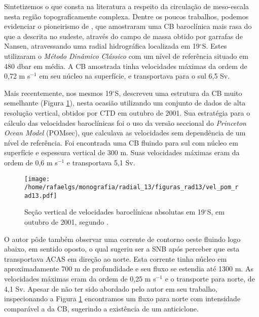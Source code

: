 Sintetizemos o que consta na literatura a respeito da circulação de meso-escala
nesta região topograficamente complexa. Dentre os poucos trabalhos, podemos
evidenciar o pioneirismo de \cite{miranda_castro1981}, que amostraram uma CB baroclínica mais rasa do que a descrita
no sudeste, através do campo de massa obtido por garrafas de Nansen, atravessando uma
radial hidrográfica localizada em 19$^\circ$S. Estes utilizaram o {\it Método Dinâmico Clássico} \citep{sandstrom_helland1903} com um 
nível de referência situado em 480 dbar em média. A CB amostrada tinha velocidades máximas da 
ordem de 0,72 m s$^{-1}$ em seu núcleo na superfície, e transportava para o sul 6,5 Sv.

Mais recentemente, nos mesmos 19$^\circ$S, \cite{soutelino2005} descreveu uma estrutura da CB muito semelhante (Figura \ref{fig:soutelino19}),
nesta ocasião utilizando um conjunto de dados de alta resolução vertical, obtidos por CTD em 
outubro de 2001. Sua estratégia para o cálculo das velocidades baroclínicas foi o uso da versão 
seccional do {\it Princeton Ocean Model} (POMsec), que calculava as velocidades sem dependência de um nível de referência. 
Foi encontrada uma CB fluindo para sul com núcleo em superfície e espessura
vertical de 300 m. Suas  velocidades máximas eram da ordem de 0,6 m s$^{-1}$ e transportava
5,1 Sv. 

\begin{figure}[hb]
 \begin{center}
  \texttt{[image: /home/rafaelgs/monografia/radial\_13/figuras\_rad13/vel\_pom\_rad13.pdf]}
 \end{center}
 \vspace{-.5cm}
 \renewcommand{\baselinestretch}{1}
 \caption{\label{fig:soutelino19} \small Seção vertical de velocidades baroclínicas absolutas em
19$^\circ$S, em outubro de 2001, segundo \cite{soutelino2005}.}
\end{figure}

O autor pôde também observar uma corrente de contorno oeste fluindo logo abaixo, em sentido 
oposto, o qual sugeriu ser a SNB após perceber que esta transportava ACAS em direção ao norte. 
Esta corrente tinha núcleo em aproximadamente 700 m de profundidade e seu fluxo se estendia até
1300 m. As velocidades máximas eram da ordem de 0,25 m s$^{-1}$ e o transporte para norte, de 4,1 Sv. 
Apesar de não ter sido abordado pelo autor em seu trabalho, inspecionando a Figura \ref{fig:soutelino19}
encontramos um fluxo para norte com intensidade comparável a da CB, sugerindo a 
existência de um anticiclone. 

